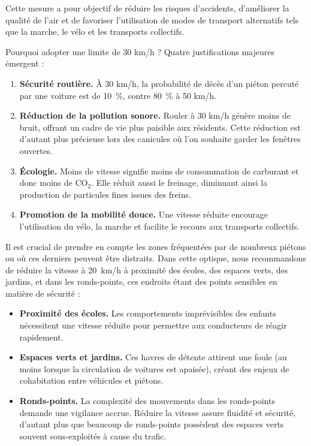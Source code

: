 Cette mesure a pour objectif de réduire les risques d'accidents,
d'améliorer la qualité de l'air et de favoriser l'utilisation de modes
de transport alternatifs tels que la marche, le vélo et les transports
collectifs.

Pourquoi adopter une limite de 30 km/h ? Quatre justifications
majeures émergent :
\begin{enumerate}
\item \textbf{Sécurité routière.} À 30 km/h, la probabilité de décès
  d'un piéton percuté par une voiture est de 10~\%, contre 80~\% à 50
  km/h.
\item \textbf{Réduction de la pollution sonore.} Rouler à 30 km/h
  génère moins de bruit, offrant un cadre de vie plus paisible aux
  résidents. Cette réduction est d'autant plus précieuse lors des
  canicules où l'on souhaite garder les fenêtres ouvertes.
\item \textbf{Écologie.} Moins de vitesse signifie moins de
  consommation de carburant et donc moins de CO$_2$. Elle réduit aussi le
  freinage, diminuant ainsi la production de particules fines issues
  des freins.
\item \textbf{Promotion de la mobilité douce.} Une vitesse réduite
  encourage l'utilisation du vélo, la marche et facilite le recours
  aux transports collectifs.
\end{enumerate}

\medskip

Il est crucial de prendre en compte les zones fréquentées par de
nombreux piétons ou où ces derniers peuvent être distraits. Dans cette
optique, nous recommandons de réduire la vitesse à 20~km/h à proximité
des écoles, des espaces verts, des jardins, et dans les ronds-points,
ces endroits étant des points sensibles en matière de sécurité :

\begin{itemize}
\item \textbf{Proximité des écoles.} Les comportements imprévisibles
  des enfants nécessitent une vitesse réduite pour permettre aux
  conducteurs de réagir rapidement.
\item \textbf{Espaces verts et jardins.} Ces havres de détente
  attirent une foule (au moins lorsque la circulation de voitures est
  apaisée), créant des enjeux de cohabitation entre véhicules et
  piétons.
\item \textbf{Ronds-points.} La complexité des mouvements dans les
  ronds-points demande une vigilance accrue. Réduire la vitesse assure
  fluidité et sécurité, d'autant plus que beaucoup de ronds-points
  possèdent des espaces verts souvent sous-exploités à cause du
  trafic.
\end{itemize}



